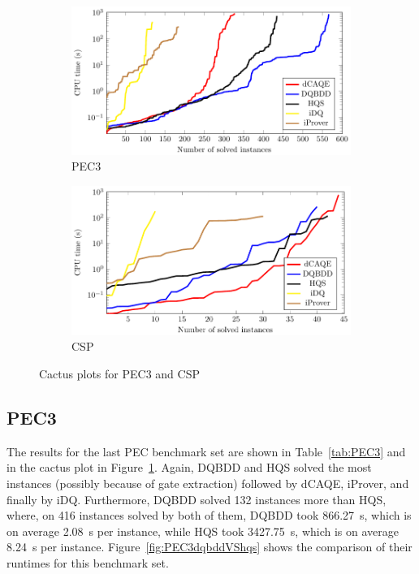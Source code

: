 \documentclass[
  digital, %
  color,
  twoside, %
  table,   %
  nolof,     %
  nolot,     %
]{fithesis3}
\theoremstyle{definition}
\theoremstyle{remark}
\begin{document}
\begin{figure}
  \centering
  \begin{subfigure}{0.98\textwidth}
    \centering
    \includegraphics[width=\textwidth]{figures/PEC3logcactusplot.pdf}
    \caption{PEC3}
    \label{fig:cactusPEC3}
  \end{subfigure}
  \begin{subfigure}{0.98\textwidth}
    \centering
    \includegraphics[width=\textwidth]{figures/CSPlogcactusplot.pdf}
    \caption{CSP}
    \label{fig:cactusCSP}
  \end{subfigure}
  \caption{Cactus plots for PEC3 and CSP}
  \label{fig:cactusPEC3CSP}
\end{figure}

\subsection{PEC3}
The results for the last PEC benchmark set are shown in Table~\ref{tab:PEC3} and in the cactus plot in Figure~\ref{fig:cactusPEC3}. Again, DQBDD and HQS solved the most instances (possibly because of gate extraction) followed by dCAQE, iProver, and finally by iDQ. Furthermore, DQBDD solved \num{132} instances more than HQS, where, on 416 instances solved by both of them, DQBDD took \SI{866.27}{s}, which is on average \SI{2.08}{s} per instance, while HQS took \SI{3427.75}{s}, which is on average \SI{8.24}{s} per instance. Figure~\ref{fig:PEC3dqbddVShqs} shows the comparison of their runtimes for this benchmark set.
\end{document}
